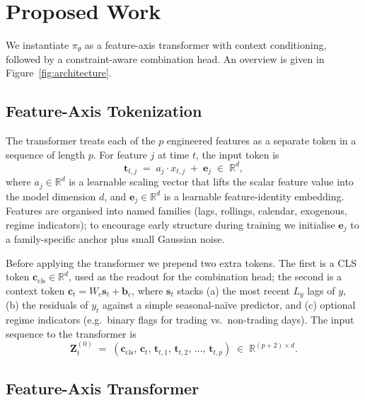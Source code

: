 \documentclass[journal]{IEEEtran}
\begin{document}
\section{Proposed Work}
\label{sec:method}

We instantiate $\pi_\theta$ as a feature-axis transformer with context conditioning, followed by a constraint-aware combination head. An overview is given in Figure~\ref{fig:architecture}.



\subsection{Feature-Axis Tokenization}
\label{sec:features}

The transformer treats each of the $p$ engineered features as a separate token in a sequence of length $p$. For feature $j$ at time $t$, the input token is
\begin{equation}
\mathbf{t}_{t,j} \;=\; a_j \cdot x_{t,j} \;+\; \mathbf{e}_j \;\in\; \mathbb{R}^d,
\end{equation}
where $a_j \in \mathbb{R}^d$ is a learnable scaling vector that lifts the scalar feature value into the model dimension $d$, and $\mathbf{e}_j \in \mathbb{R}^d$ is a learnable feature-identity embedding. Features are organised into named families (lags, rollings, calendar, exogenous, regime indicators); to encourage early structure during training we initialise $\mathbf{e}_j$ to a family-specific anchor plus small Gaussian noise.

Before applying the transformer we prepend two extra tokens. The first is a CLS token $\mathbf{c}_\mathrm{cls} \in \mathbb{R}^d$, used as the readout for the combination head; the second is a context token $\mathbf{c}_t = W_c \mathbf{s}_t + \mathbf{b}_c$, where $\mathbf{s}_t$ stacks (a) the most recent $L_y$ lags of $y$, (b) the residuals of $y_t$ against a simple seasonal-na\"ive predictor, and (c) optional regime indicators (e.g.\ binary flags for trading vs.\ non-trading days). The input sequence to the transformer is
\begin{equation}
\mathbf{Z}_t^{(0)} \;=\; (\mathbf{c}_\mathrm{cls},\, \mathbf{c}_t,\, \mathbf{t}_{t,1},\, \mathbf{t}_{t,2},\, \dots,\, \mathbf{t}_{t,p}) \;\in\; \mathbb{R}^{(p+2)\times d}.
\end{equation}

\subsection{Feature-Axis Transformer}
\end{document}
